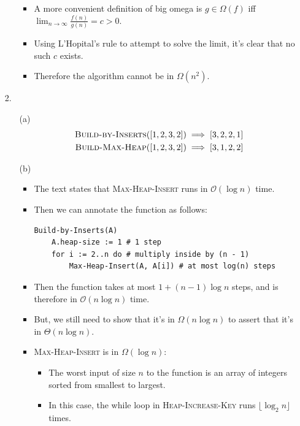 \documentclass{article}
\begin{document}
\begin{enumerate}
\begin{enumerate}
\begin{itemize}
        \item A more convenient definition of big omega is $g \in \Omega(f)$ iff $\lim_{n \to \infty} \frac{f(n)}{g(n)} = c > 0$.
        \item Using L'Hopital's rule to attempt to solve the limit, it's clear that no such $c$ exists.
        \item Therefore the algorithm cannot be in $\Omega(n^2)$.
        \end{itemize}
    \end{enumerate}

\item [2.]
    \begin{enumerate}
    \item [(a)]
        \begin{equation*}
        \begin{aligned}
            \textsc{Build-by-Inserts}([1, 2, 3, 2]) & \implies [3, 2, 2, 1] \\
            \textsc{Build-Max-Heap}([1, 2, 3, 2]) & \implies [3, 1, 2, 2]
        \end{aligned}
        \end{equation*}
    \item [(b)]
        \begin{itemize}
        \item The text states that \textsc{Max-Heap-Insert} runs in $\mathcal{O}(\log n)$ time.
        \item Then we can annotate the function as follows:
            \begin{lstlisting}
Build-by-Inserts(A)
    A.heap-size := 1 # 1 step
    for i := 2..n do # multiply inside by (n - 1)
        Max-Heap-Insert(A, A[i]) # at most log(n) steps
            \end{lstlisting}
        \item Then the function takes at most $1 + (n - 1) \log n$ steps, and is therefore in $\mathcal{O}(n \log n)$ time.
        \item But, we still need to show that it's in $\Omega(n \log n)$ to assert that it's in $\Theta(n \log n)$.
        \item \textsc{Max-Heap-Insert} is in $\Omega(\log n)$:
            \begin{itemize}
            \item The worst input of size $n$ to the function is an array of integers sorted from smallest to largest.
            \item In this case, the while loop in \textsc{Heap-Increase-Key} runs $\lfloor \log_2 n \rfloor$ times.

\end{itemize}
\end{itemize}
\end{enumerate}
\end{enumerate}
\end{document}

